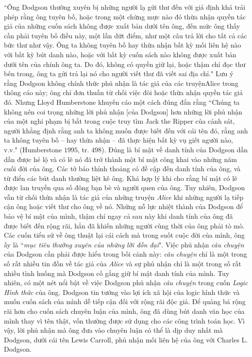 \begin{multicols}{2}
	\vskip 0.1cm
	``Ông Dodgson thường xuyên bị những người lạ gửi thư đến với giả định khá trái phép rằng ông tuyên bố, hoặc trong một chừng mực nào đó thừa nhận quyền tác giả của những cuốn sách không được xuất bản dưới tên ông, đến mức ông thấy cần phải tuyên bố điều này, một lần dứt điểm, như một câu trả lời cho tất cả các bức thư như vậy. Ông ta không tuyên bố hay thừa nhận bất kỳ mối liên hệ nào với bất kỳ bút danh nào, hoặc với bất kỳ cuốn sách nào không được xuất bản dưới tên của chính ông ta. Do đó, không có quyền giữ lại, hoặc thậm chí đọc thư bên trong, ông ta gửi trả lại nó cho người viết thư đã viết sai địa chỉ."
	\vskip 0.1cm
	Lưu ý rằng Dodgson không chính thức phủ nhận là tác giả của các truyệnAlice trong thông cáo này; ông chỉ đơn thuần từ chối việc đòi hoặc thừa nhận quyền tác giả đó. Nhưng Lloyd Humberstone khuyến cáo một cách đúng đắn rằng
	``Chúng ta không nên coi trọng những lời phủ nhận [của Dodgson] hơn những lời phủ nhận của một nghi phạm bị bắt trong cuộc truy tìm Jack the Ripper của cảnh sát, người khẳng định rằng anh ta không muốn được biết đến với cái tên đó, rằng anh ta không tuyên bố -- hay thừa nhận -- đã thực hiện bất kỳ vụ giết người nào, v.v." (Humberstone $1995$, tr. $498$).
	\vskip 0.1cm
	Đúng là bí mật về danh tính của Dodgson dần dần được hé lộ và có lẽ nó đã trở thành một bí mật công khai vào những năm cuối đời của ông. Các tờ báo thỉnh thoảng có đề cập đến danh tính của ông, và từ điển các bút danh thường liệt kê ông. Khá hợp lý khi cho rằng bí mật có lẽ được lan truyền qua số đông bạn bè và người quen của ông. Tuy nhiên, Dodgson vẫn từ chối thừa nhận là tác giả của những truyện \textit{Alice} khi những người lạ tiếp cận ông hoặc viết thư cho ông về nó. Những nỗ lực nhiệt thành của Dodgson để bảo vệ bí mật của mình,  thậm chí ngay cả sau này khi danh tính của ông đã được biết đến rộng rãi, hẳn đã khiến những người cùng thời của ông phải tò mò. Các cuốn tiểu sử về ông thuật lại cái cách mà trong suốt cuộc đời của mình, ông ấy là ``\textit{mục tiêu thường xuyên của những lời đồn đại}".
	\vskip 0.1cm
	Việc phủ nhận \textit{câu chuyện} của Dodgson cần phải được hiểu trong bối cảnh này: \textit{câu chuyện} chỉ là một trong số rất nhiều tin đồn về tác giả của \textit{Alice} và sự phủ nhận chỉ là một trong số rất nhiều tình huống mà Dodgson cố gắng giữ bí mật danh tính của mình. Tuy nhiên, có một nét nổi bật về việc Dodgson phủ nhận \textit{câu chuyện} trong cuốn \textit{Logic Hình thức} của ông. Dodgson tin tưởng vào lợi ích xã hội của logic hình thức và muốn cuốn sách của mình dễ tiếp cận đối với rộng rãi độc giả. Để quảng bá rộng rãi hơn cho cuốn sách chuyên luận  của mình, ông đã dùng bút danh văn học của mình thay vì tên thật, vốn thường được sử dụng cho các công trình toán học. Vì vậy, lời phủ nhận mà ông  đưa vào chuyên luận có thể là dịp duy nhất mà Dodgson, dưới cái tên Lewis Carroll, phủ nhận mối liên hệ của ông với Charles L. Dodgson.

\end{multicols}
